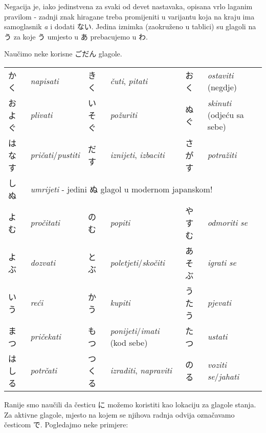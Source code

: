 	Negacija je, iako jedinstvena za svaki od devet nastavaka, opisana vrlo laganim pravilom - zadnji znak hiragane treba promijeniti u varijantu koja na kraju ima samoglasnik \textit{a} i dodati ない. Jedina iznimka (zaokruženo u tablici) su glagoli na う za koje う umjesto u あ prebacujemo u わ.
	
	Naučimo neke korisne ごだん glagole.
	
	\vspace{10pt}
	\begin{tabular}{l l l l l l}
		かく & \textit{napisati} & きく & \textit{čuti}, \textit{pitati} & おく & \textit{ostaviti} (negdje)\\
		およぐ & \textit{plivati} & いそぐ & \textit{požuriti} & ぬぐ & \textit{skinuti} (odjeću sa sebe)\\\vspace{5pt}
		はなす & \textit{pričati}/\textit{pustiti} & だす & \textit{iznijeti}, \textit{izbaciti} & さがす & \textit{potražiti}\\
		しぬ & \multicolumn{5}{l}{\textit{umrijeti} - jedini ぬ glagol u modernom japanskom!}\\
		よむ & \textit{pročitati} & のむ & \textit{popiti} & やすむ & \textit{odmoriti se}\\\vspace{5pt}
		よぶ & \textit{dozvati} & とぶ & \textit{poletjeti}/\textit{skočiti} & あそぶ & \textit{igrati se}\\
		いう & \textit{reći} & かう & \textit{kupiti} & うたう & \textit{pjevati}\\
		まつ & \textit{pričekati} & もつ & \textit{ponijeti}/\textit{imati} (kod sebe) & たつ & \textit{ustati}\\
		はしる & \textit{potrčati} & つくる & \textit{izraditi}, \textit{napraviti} & のる & \textit{voziti se}/\textit{jahati}\\
	\end{tabular}

	\newpage
	
	Ranije smo naučili da česticu に možemo koristiti kao lokaciju za glagole stanja. Za aktivne glagole, mjesto na kojem se njihova radnja odvija označavamo česticom で. Pogledajmo neke primjere:
	
	\begin{reibun}
	\end{reibun}

